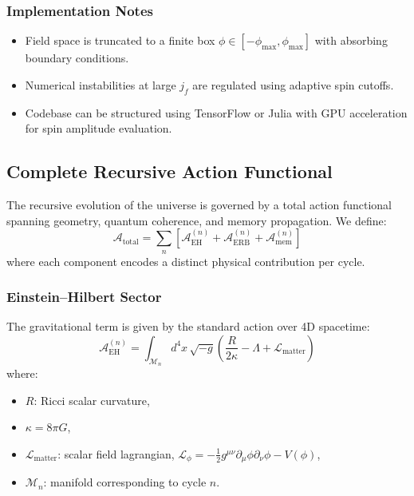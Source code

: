 \subsubsection*{Implementation Notes}

\begin{itemize}
  \item Field space is truncated to a finite box \( \phi \in [-\phi_{\max}, \phi_{\max}] \) with absorbing boundary conditions.
  \item Numerical instabilities at large \( j_f \) are regulated using adaptive spin cutoffs.
  \item Codebase can be structured using TensorFlow or Julia with GPU acceleration for spin amplitude evaluation.
\end{itemize}

\subsection*{Complete Recursive Action Functional}
\label{appendix:C6}

The recursive evolution of the universe is governed by a total action functional spanning geometry, quantum coherence, and memory propagation. We define:
\begin{equation}
\mathcal{A}_{\text{total}} = \sum_{n} \left[ \mathcal{A}_{\text{EH}}^{(n)} + \mathcal{A}_{\text{ERB}}^{(n)} + \mathcal{A}_{\text{mem}}^{(n)} \right]
\end{equation}
where each component encodes a distinct physical contribution per cycle.

\subsubsection*{Einstein–Hilbert Sector}

The gravitational term is given by the standard action over 4D spacetime:
\begin{equation}
\mathcal{A}_{\text{EH}}^{(n)} = \int_{\mathcal{M}_n} d^4x \, \sqrt{-g} \left( \frac{R}{2\kappa} - \Lambda + \mathcal{L}_{\text{matter}} \right)
\end{equation}
where:
\begin{itemize}
  \item \( R \): Ricci scalar curvature,
  \item \( \kappa = 8\pi G \),
  \item \( \mathcal{L}_{\text{matter}} \): scalar field lagrangian, \( \mathcal{L}_{\phi} = -\frac{1}{2} g^{\mu\nu} \partial_\mu \phi \partial_\nu \phi - V(\phi) \),
  \item \( \mathcal{M}_n \): manifold corresponding to cycle \( n \).
\end{itemize}

